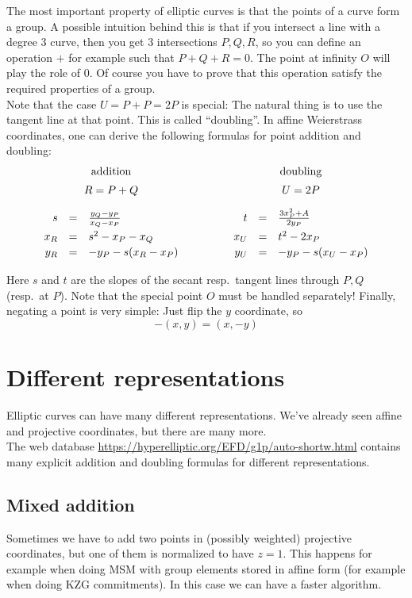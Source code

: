 \documentclass[12pt,draft,a4paper,openany,oneside]{amsbook}
\def\qquad{\quad\quad}
\theoremstyle{plain}
\theoremstyle{definition}
\begin{document}
The most important property of elliptic curves is that the points of a curve form a group.
A possible intuition behind this is that if you intersect a line with a degree 3 curve,
then you get 3 intersections $P,Q,R$, so you can define an operation $+$ for example
such that $P+Q+R=0$. The point at infinity $O$ will play the role of $0$. Of course
you have to prove that this operation satisfy the required properties of a group.\\

Note that the case $U=P+P=2P$ is special: The natural thing is to use the tangent line at
that point. This is called ``doubling''. In affine Weierstrass coordinates, one can
derive the following formulas for point addition and doubling:\\
\[
\begin{array}{rclcrcl}
\multicolumn{3}{c}{\textrm{addition}} &
\multicolumn{1}{c}{\qquad} &
\multicolumn{3}{c}{\textrm{doubling}} \\[5pt]
\multicolumn{3}{c}{R=P+Q}  &
\multicolumn{1}{c}{\qquad} &
\multicolumn{3}{c}{U=2P}   \\[10pt]
 s   &=& \frac{y_Q-y_P}{x_Q-x_P}  & \quad\quad\quad &  t   &=& \frac{3x_P^2+A}{2 y_P}  \\[5pt]
 x_R &=&  s^2 - x_P - x_Q         & \quad\quad\quad &  x_U &=&  t^2 - 2x_P             \\[2pt]
 y_R &=& -y_P - s(x_R - x_P)      & \quad\quad\quad &  y_U &=& - y_P - s(x_U - x_P)    \\[5pt]
\end{array}
\]
Here $s$ and $t$ are the slopes of the secant resp.~tangent lines through $P,Q$
(resp.~at $P$). Note that the special point $O$ must be handled separately!
Finally, negating a point is very simple: Just flip the $y$ coordinate, so 
\[ -(x,y) = (x,-y) \]

\section{Different representations}

Elliptic curves can have many different representations. We've already seen
affine and projective coordinates, but there are many more.\\

The web database \url{https://hyperelliptic.org/EFD/g1p/auto-shortw.html} 
contains many explicit addition and doubling formulas for different representations.

\subsection{Mixed addition}
Sometimes we have to add two points in (possibly weighted) projective coordinates,
but one of them is normalized to have $z=1$. This happens for example when doing MSM 
with group elements stored in affine form (for example when doing KZG commitments).
In this case we can have a faster algorithm.
\end{document}

